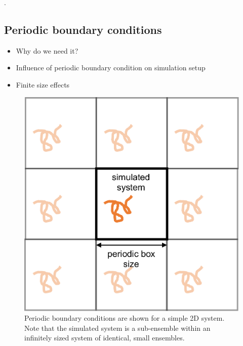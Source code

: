 \documentclass[9pt,bestpractices]{livecoms}
\begin{document}
.

\subsection{Periodic boundary conditions}
\label{sec:periodic}
\begin{itemize}
\item Why do we need it?
\item Influence of periodic boundary condition on simulation setup
\item Finite size effects
\end{itemize}

\begin{figure}[h]
\centering
\includegraphics[width=\linewidth]{PBC_figure.pdf}
\caption{Periodic boundary conditions are shown for a simple 2D system. Note that the simulated system is a sub-ensemble within an infinitely sized system of identical, small ensembles.}
\label{pbcfig}
\end{figure}
\end{document}
